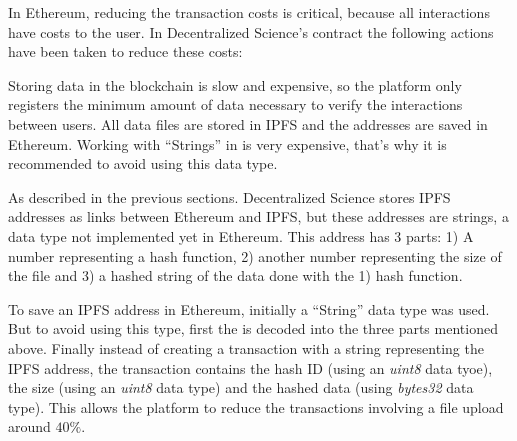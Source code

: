 In Ethereum, reducing the transaction costs is critical, because all
interactions have costs to the user. In Decentralized Science's contract the
following actions have been taken to reduce these costs:

\begin{itemize}
   Storing data in the
  blockchain is slow and expensive, so the platform only registers the minimum
  amount of data necessary to verify the interactions between users. All data
  files are stored in IPFS and the addresses are saved in Ethereum.  Working with ``Strings'' in  is very
  expensive, that's why it is recommended to avoid using this data type.

  As described in the previous sections. Decentralized Science stores IPFS
  addresses as links between Ethereum and IPFS, but these addresses are
   strings, a data type not implemented yet in Ethereum. This address
  has 3 parts: 1) A number representing a hash function, 2) another number
  representing the size of the file and 3) a hashed string of the data done with
  the 1) hash function.

  To save an IPFS address in Ethereum, initially a ``String'' data type was
  used. But to avoid using this type, first the  is decoded into the
  three parts mentioned above. Finally instead of creating a transaction with a
  string representing the IPFS address, the transaction contains the hash ID
  (using an \emph{uint8} data tyoe), the size (using an \emph{uint8} data type)
  and the hashed data (using \emph{bytes32} data type). This allows the platform
  to reduce the transactions involving a file upload around $40\%$.
\end{itemize}

